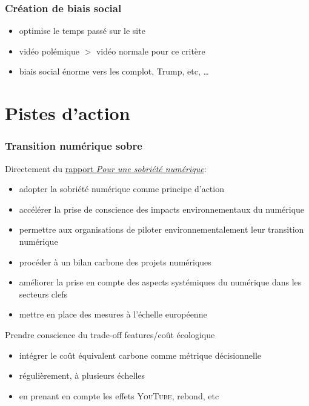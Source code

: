 \documentclass[10pt]{beamer}
\begin{document}
\begin{frame}
  \frametitle{Création de biais social}


  \begin{itemize}[<+->]
  \item optimise le temps passé sur le site
  \item vidéo polémique $>$ vidéo normale pour ce critère
  \item biais social énorme vers les complot, Trump, etc, …
  \end{itemize}

\end{frame}

\section{Pistes d'action}
\label{sec:piste-d-action}

\begin{frame}
  \frametitle{Transition numérique sobre}
  Directement du \href{https://theshiftproject.org%
    /wp-content/uploads/2018/10%
    /2018-10-04_Rapport_Pour-une-sobri\%C3\%A9t\%C3\%A9%
    -num\%C3\%A9rique_Rapport_The-Shift-Project.pdf}{rapport \emph{Pour une
    sobriété numérique}}:
  \begin{itemize}[<+->]
  \item adopter la sobriété numérique comme principe d'action
  \item accélérer la prise de conscience des impacts environnementaux
    du numérique
  \item permettre aux organisations de piloter environnementalement
    leur transition numérique
  \item procéder à un bilan carbone des projets numériques
  \item améliorer la prise en compte des aspects systémiques du
    numérique dans les secteurs clefs
  \item mettre en place des mesures à l'échelle européenne
  \end{itemize}
\end{frame}

\begin{frame}{Prendre conscience du trade-off features/coût
    écologique}
  \begin{itemize}[<+->]
  \item intégrer le coût équivalent carbone comme métrique
    décisionnelle
  \item régulièrement, à plusieurs échelles
  \item en prenant en compte les effets \textsc{YouTube}, rebond, etc
  \end{itemize}
\end{frame}
\end{document}
